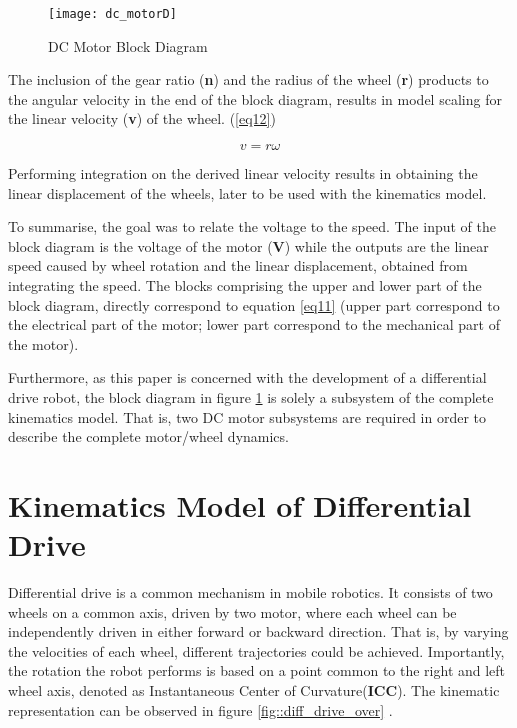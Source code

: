 \begin{figure}[h]
\centering
\texttt{[image: dc\_motorD]}
\caption{DC Motor Block Diagram}
\label{fig::dcmfigure}
\end{figure}

The inclusion of the gear ratio (\textbf{n}) and the radius of the wheel (\textbf{r}) products to the angular velocity in the end of the block diagram, results in model scaling for the linear velocity (\textbf{v}) of the wheel. (\ref{eq12})

\begin{equation} \label{eq12}
v = r\omega
\end{equation}

Performing integration on the derived linear velocity results in obtaining the linear displacement of the wheels, later to be used with the kinematics model. 

To summarise, the goal was to relate the voltage to the speed. The input of the block diagram is the voltage of the motor (\textbf{V}) while the outputs are the linear speed caused by wheel rotation and the linear displacement, obtained from integrating the speed. The blocks comprising the upper and lower part of the block diagram, directly correspond to equation \ref{eq11} (upper part correspond to the electrical part of the motor; lower part correspond to the mechanical part of the motor).

Furthermore, as this paper is concerned with the development of a differential drive robot, the block diagram in figure \ref{fig::dcmfigure} is solely a subsystem of the complete kinematics model. That is, two DC motor subsystems are required in order to describe the complete motor/wheel dynamics. 

\section{Kinematics Model of Differential Drive} \label{kin_model} 

Differential drive is a common mechanism in mobile robotics. It consists of two wheels on a common axis, driven by two motor, where each wheel can be independently driven in either forward or backward direction. That is, by varying the velocities of each wheel, different  trajectories could be achieved. Importantly, the rotation the robot performs is based on a point common to the right and left wheel axis, denoted as Instantaneous Center of Curvature(\textbf{ICC}). The kinematic representation can be observed in figure \ref{fig::diff_drive_over} .

